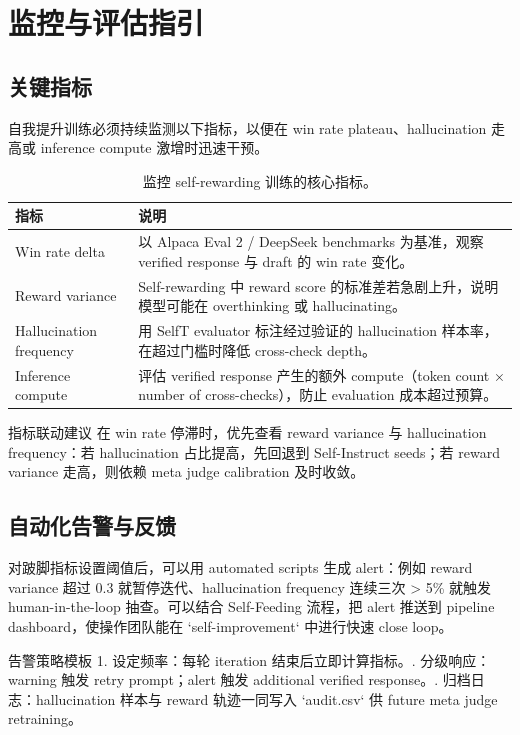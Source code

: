 \documentclass[a4paper]{article}
\begin{document}
\section{监控与评估指引}
\subsection{关键指标}
自我提升训练必须持续监测以下指标，以便在 win rate plateau、hallucination 走高或 inference compute 激增时迅速干预。

\begin{table}[H]
\centering
\begin{tabular}{p{5cm}p{10cm}}
\toprule
指标 & 说明 \\
\midrule
Win rate delta & 以 Alpaca Eval 2 / DeepSeek benchmarks 为基准，观察 verified response 与 draft 的 win rate 变化。 \\
Reward variance & Self-rewarding 中 reward score 的标准差若急剧上升，说明模型可能在 overthinking 或 hallucinating。 \\
Hallucination frequency & 用 SelfT evaluator 标注经过验证的 hallucination 样本率，在超过门槛时降低 cross-check depth。 \\
Inference compute & 评估 verified response 产生的额外 compute（token count × number of cross-checks），防止 evaluation 成本超过预算。 \\
\bottomrule
\end{tabular}
\caption{监控 self-rewarding 训练的核心指标。}
\end{table}

\begin{importantbox}{指标联动建议}
在 win rate 停滞时，优先查看 reward variance 与 hallucination frequency：若 hallucination 占比提高，先回退到 Self-Instruct seeds；若 reward variance 走高，则依赖 meta judge calibration 及时收敛。
\end{importantbox}

\subsection{自动化告警与反馈}
对跛脚指标设置阈值后，可以用 automated scripts 生成 alert：例如 reward variance 超过 0.3 就暂停迭代、hallucination frequency 连续三次 > 5\% 就触发 human-in-the-loop 抽查。可以结合 Self-Feeding 流程，把 alert 推送到 pipeline dashboard，使操作团队能在 `self-improvement` 中进行快速 close loop。

\begin{knowledgebox}{告警策略模板}
1. 设定频率：每轮 iteration 结束后立即计算指标。. 分级响应：warning 触发 retry prompt；alert 触发 additional verified response。. 归档日志：hallucination 样本与 reward 轨迹一同写入 `audit.csv` 供 future meta judge retraining。
\end{knowledgebox}
\end{document}
